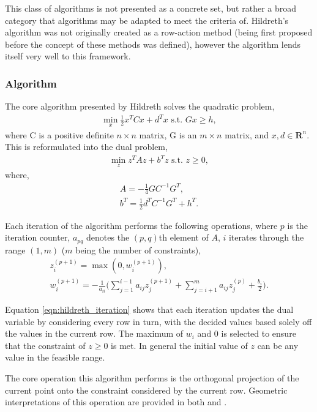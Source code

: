 This class of algorithms is not presented as a concrete set, but rather a broad category that algorithms may be adapted to meet the criteria of. Hildreth's algorithm was not originally created as a row-action method (being first proposed before the concept of these methods was defined), however the algorithm lends itself very well to this framework.

\subsubsection{Algorithm}\label{subsub_hildreth_algo}

The core algorithm presented by Hildreth solves the quadratic problem,
\begin{gather}
\min_x \frac{1}{2}x^TCx + d^Tx \text{ s.t. } Gx \geq h,\label{eqn:QP_prob}
\end{gather}
where C is a positive definite $n \times n$ matrix, G is an $m \times n$ matrix, and $x,d \in \mathbf{R}^n$. This is reformulated into the dual problem,
\begin{gather}
\min_z z^TAz + b^Tz \text{ s.t. }z\geq0,
\end{gather}
where,
\begin{gather}
A = -\frac{1}{4}GC^{-1}G^T, \label{eqn:QP_prob_var_A}\\
b^T = \frac{1}{2}d^TC^{-1}G^T + h^T.\label{eqn:QP_prob_var_b}
\end{gather}

Each iteration of the algorithm performs the following operations, where $p$ is the iteration counter, $a_{pq}$ denotes the $(p,q)$th element of $A$, $i$ iterates through the range $(1,m)$ ($m$ being the number of constraints),
\begin{gather}
z_i^{(p+1)} = \max(0, w_i^{(p+1)})\label{eqn:case_b_dec},\\
w_i^{(p+1)} = -\frac{1}{a_{ii}}\big(\sum_{j=1}^{i-1}a_{ij}z_j^{(p+1)}+\sum_{j=i+1}^ma_{ij}z_j^{(p)} + \frac{b_i}{2}\big).\label{eqn:hildreth_iteration}
\end{gather}

Equation \ref{eqn:hildreth_iteration} shows that each iteration updates the dual variable by considering every row in turn, with the decided values based solely off the values in the current row. The maximum of $w_i$ and $0$ is selected to ensure that the constraint of $z\geq 0$ is met. In general the initial value of $z$ can be any value in the feasible range.

The core operation this algorithm performs is the orthogonal projection of the current point onto the constraint considered by the current row. Geometric interpretations of this operation are provided in both \cite{Lents1980EXTENSIONSPROGRAMMING} and \cite{ROW-ACTIONCENSORS}.
   

